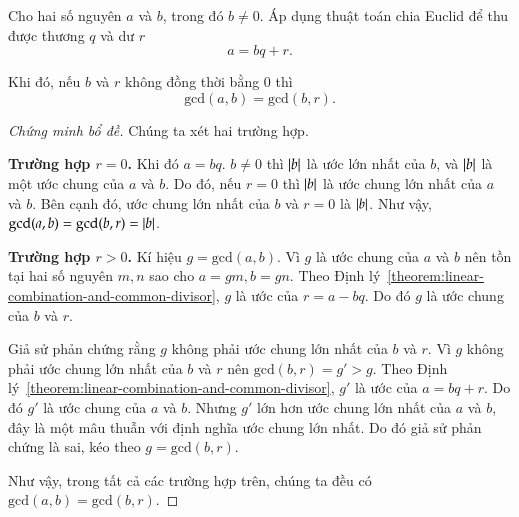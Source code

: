 \begin{lemma}
	Cho hai số nguyên $a$ và $b$, trong đó $b\ne 0$. Áp dụng thuật toán chia Euclid để thu được thương $q$ và dư $r$
	\[
		a = b q + r.
	\]

	\noindent Khi đó, nếu $b$ và $r$ không đồng thời bằng $0$ thì
	\[
		\text{gcd}(a, b) = \text{gcd}(b, r).
	\]
\end{lemma}

\begin{proof}[Chứng minh bổ đề]
	Chúng ta xét hai trường hợp.

	\textbf{Trường hợp $r = 0$.} Khi đó $a = b q$. $b\ne 0$ thì $\left\vert{b}\right\vert$ là ước lớn nhất của $b$, và $\left\vert{b}\right\vert$ là một ước chung của $a$ và $b$. Do đó, nếu $r = 0$ thì $\left\vert{b}\right\vert$ là ước chung lớn nhất của $a$ và $b$. Bên cạnh đó, ước chung lớn nhất của $b$ và $r = 0$ là $\left\vert{b}\right\vert$. Như vậy, $\text{gcd}(a, b) = \text{gcd}(b, r) = \left\vert{b}\right\vert$.

	\textbf{Trường hợp $r > 0$.} Kí hiệu $g = \text{gcd}(a, b)$. Vì $g$ là ước chung của $a$ và $b$ nên tồn tại hai số nguyên $m, n$ sao cho $a = g m, b = g n$. Theo Định lý~\ref{theorem:linear-combination-and-common-divisor}, $g$ là ước của $r = a - b q$. Do đó $g$ là ước chung của $b$ và $r$.

	Giả sử phản chứng rằng $g$ không phải ước chung lớn nhất của $b$ và $r$. Vì $g$ không phải ước chung lớn nhất của $b$ và $r$ nên $\text{gcd}(b, r) = g' > g$. Theo Định lý~\ref{theorem:linear-combination-and-common-divisor}, $g'$ là ước của $a = b q + r$.  Do đó $g'$ là ước chung của $a$ và $b$. Nhưng $g'$ lớn hơn ước chung lớn nhất của $a$ và $b$, đây là một mâu thuẫn với định nghĩa ước chung lớn nhất. Do đó giả sử phản chứng là sai, kéo theo $g = \text{gcd}(b, r)$.

	Như vậy, trong tất cả các trường hợp trên, chúng ta đều có $\text{gcd}(a, b) = \text{gcd}(b, r)$.
\end{proof}

